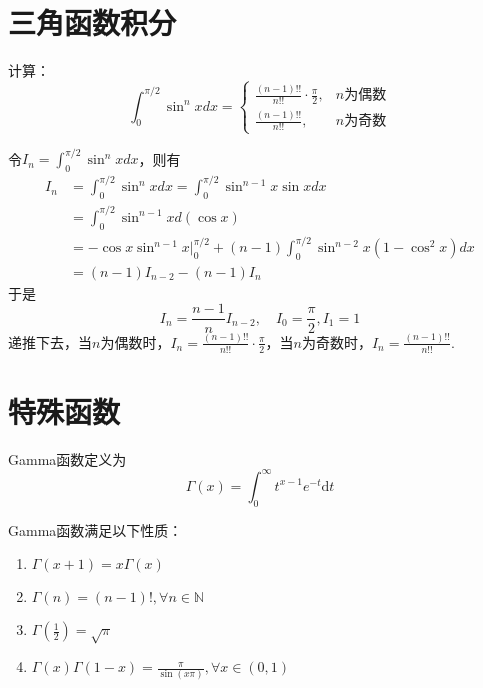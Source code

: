 \section{三角函数积分}

计算：
\[
    \int_0^{\pi/2}\sin^n x dx=\begin{cases}
        \frac{(n-1)!!}{n!!}\cdot\frac{\pi}{2},&n\text{为偶数}\\
        \frac{(n-1)!!}{n!!},&n\text{为奇数}
    \end{cases}
\]
\begin{solution}
    令$I_n=\int_0^{\pi/2}\sin^n x dx$，则有
    \begin{align*}
        I_n &= \int_0^{\pi/2}\sin^n x dx = \int_0^{\pi/2}\sin^{n-1} x \sin x dx \\
        &= \int_0^{\pi/2}\sin^{n-1} x d(\cos x) \\
        &= -\cos x \sin^{n-1} x \Big|_0^{\pi/2} + (n-1)\int_0^{\pi/2}\sin^{n-2} x (1-\cos^2 x) dx \\
        &= (n-1)I_{n-2}-(n-1)I_n
    \end{align*}
    于是
    \[
        I_n=\frac{n-1}{n}I_{n-2},\quad I_0=\frac{\pi}{2},I_1=1
    \]
    递推下去，当$n$为偶数时，$I_n = \frac{(n-1)!!}{n!!}\cdot\frac{\pi}{2}$，当$n$为奇数时，$I_n = \frac{(n-1)!!}{n!!}$.
\end{solution}

\section{特殊函数}

\begin{definition}[Gamma函数]
    Gamma函数定义为
    $$
    \Gamma(x) = \int_0^\infty t^{x-1}e^{-t}\mathrm{d}t
    $$
\end{definition}

\begin{theorem}[Gamma函数的性质]
    Gamma函数满足以下性质：
    \begin{enumerate}
        \item $\Gamma(x+1) = x\Gamma(x)$
        \item $\Gamma(n) = (n-1)!,\forall n\in\mathbb{N}$
        \item $\Gamma\left(\frac{1}{2}\right) = \sqrt{\pi}$
        \item $\Gamma(x)\Gamma(1-x) = \frac{\pi}{\sin(x\pi)},\forall x\in(0,1)$
    \end{enumerate}
\end{theorem}

